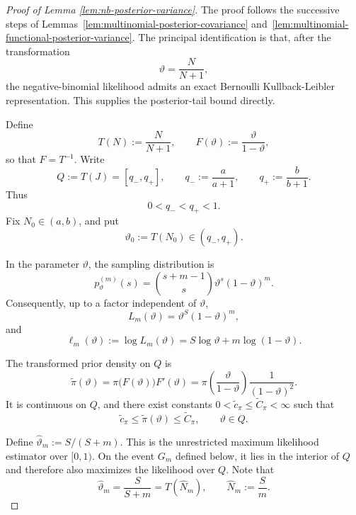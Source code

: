 \documentclass{article}
\theoremstyle{named}
\theoremstyle{named1}
\theoremstyle{plain}
\theoremstyle{remark}
\begin{document}
\begin{proof}[Proof of Lemma \ref{lem:nb-posterior-variance}]
The proof follows the successive steps of Lemmas~\ref{lem:multinomial-posterior-covariance} and~\ref{lem:multinomial-functional-posterior-variance}.
The principal identification is that, after the transformation
\[
    \vartheta=\frac{N}{N+1},
\]
the negative-binomial likelihood admits an exact Bernoulli
Kullback-Leibler representation. This supplies the posterior-tail
bound directly.

Define
\[
    T(N):=\frac{N}{N+1},
    \qquad
    F(\vartheta):=\frac{\vartheta}{1-\vartheta},
\]
so that \(F=T^{-1}\). Write
\[
    Q:=T(J)=[q_-,q_+],
    \qquad
    q_-:=\frac{a}{a+1},
    \qquad
    q_+:=\frac{b}{b+1}.
\]
Thus
\[
    0<q_-<q_+<1.
\]
Fix \(N_0\in(a,b)\), and put
\[
    \vartheta_0:=T(N_0)\in(q_-,q_+).
\]

In the parameter \(\vartheta\), the sampling distribution is
\[
    p_\vartheta^{(m)}(s)
    =
    \binom{s+m-1}{s}
    \vartheta^s(1-\vartheta)^m.
\]
Consequently, up to a factor independent of \(\vartheta\),
\[
    L_m(\vartheta)
    =
    \vartheta^S(1-\vartheta)^m,
\]
and
\begin{equation}
    \ell_m(\vartheta)
    :=
    \log L_m(\vartheta)
    =
    S\log\vartheta+m\log(1-\vartheta).
    \label{eq:nb-proof-loglik}
\end{equation}

The transformed prior density on \(Q\) is
\begin{equation}
    \widetilde\pi(\vartheta)
    =
    \pi\bigl(F(\vartheta)\bigr)F'(\vartheta)
    =
    \pi\left(\frac{\vartheta}{1-\vartheta}\right)
    \frac{1}{(1-\vartheta)^2}.
    \label{eq:nb-proof-transformed-prior}
\end{equation}
It is continuous on \(Q\), and there exist constants
\(0<\widetilde c_\pi\leq\widetilde C_\pi<\infty\) such that
\begin{equation}
    \widetilde c_\pi
    \leq
    \widetilde\pi(\vartheta)
    \leq
    \widetilde C_\pi,
    \qquad \vartheta\in Q.
    \label{eq:nb-proof-prior-bounds}
\end{equation}

Define $\widehat\vartheta_m:=S/(S+m)$.
This is the unrestricted maximum likelihood estimator over $[0,1)$.
On the event $G_m$ defined below, it lies in the interior of $Q$ and
therefore also maximizes the likelihood over $Q$. Note that
\[
    \widehat\vartheta_m
    =
    \frac{S}{S+m}
    =
    T(\widehat N_m),
    \qquad
    \widehat N_m:=\frac{S}{m}.
\]


\end{proof}
\end{document}
